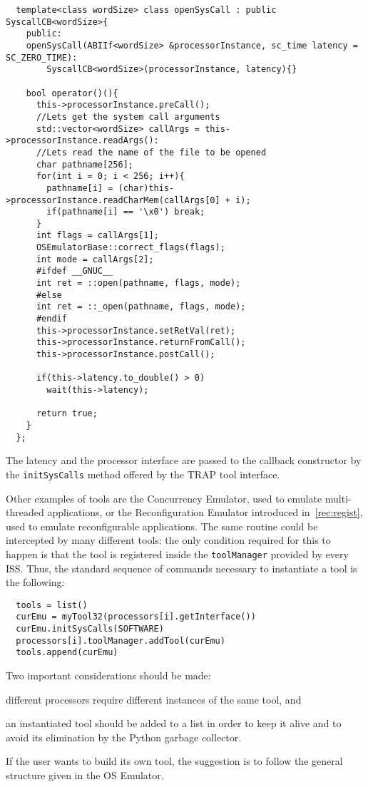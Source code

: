 \scriptsize
\begin{verbatim}
  template<class wordSize> class openSysCall : public SyscallCB<wordSize>{
    public:
    openSysCall(ABIIf<wordSize> &processorInstance, sc_time latency = SC_ZERO_TIME):
        SyscallCB<wordSize>(processorInstance, latency){}

    bool operator()(){
      this->processorInstance.preCall();
      //Lets get the system call arguments
      std::vector<wordSize> callArgs = this->processorInstance.readArgs():
      //Lets read the name of the file to be opened
      char pathname[256];
      for(int i = 0; i < 256; i++){
        pathname[i] = (char)this->processorInstance.readCharMem(callArgs[0] + i);
        if(pathname[i] == '\x0') break;
      }
      int flags = callArgs[1];
      OSEmulatorBase::correct_flags(flags);
      int mode = callArgs[2];
      #ifdef __GNUC__
      int ret = ::open(pathname, flags, mode);
      #else
      int ret = ::_open(pathname, flags, mode);
      #endif
      this->processorInstance.setRetVal(ret);
      this->processorInstance.returnFromCall();
      this->processorInstance.postCall();

      if(this->latency.to_double() > 0)
        wait(this->latency);

      return true;
    }
  };
\end{verbatim}
\normalsize
The latency and the processor interface are passed to the callback constructor by the \texttt{initSysCalls} method offered by the TRAP tool interface.

\indent Other examples of tools are the Concurrency Emulator, used to emulate multi-threaded applications, or the Reconfiguration Emulator introduced in~\ref{rec:regist}, used to emulate reconfigurable applications. The same routine could be intercepted by many different tools: the only condition required for this to happen is that the tool is registered inside the \texttt{toolManager} provided by every ISS. Thus, the standard sequence of commands necessary to instantiate a tool is the following:

\scriptsize
\begin{verbatim}
  tools = list()
  curEmu = myTool32(processors[i].getInterface())
  curEmu.initSysCalls(SOFTWARE)
  processors[i].toolManager.addTool(curEmu)
  tools.append(curEmu)
\end{verbatim}
\normalsize
Two important considerations should be made:
\begin{inparaenum}
  \item different processors require different instances of the same tool, and
  \item an instantiated tool should be added to a list in order to keep it alive and to avoid its elimination by the Python garbage collector.
\end{inparaenum}

\indent If the user wants to build its own tool, the suggestion is to follow the general structure given in the OS Emulator.